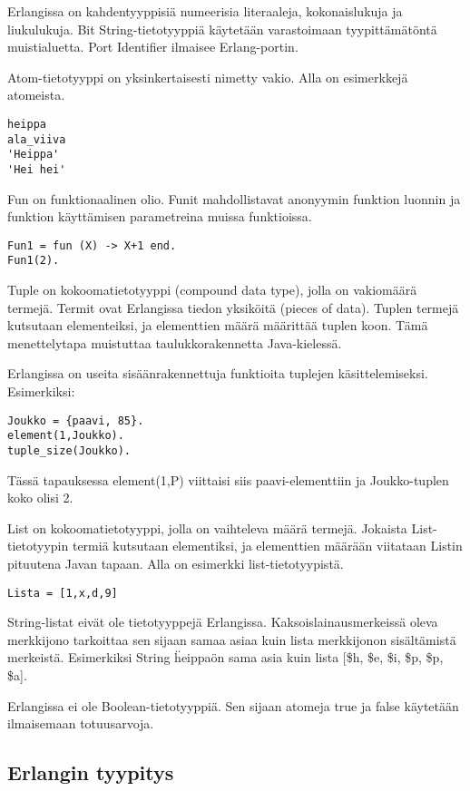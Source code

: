 \documentclass[11pt,oneside,a4paper]{article}
\begin{document}
Erlangissa on kahdentyyppisiä numeerisia literaaleja, kokonaislukuja ja
liukulukuja. Bit String-tietotyyppiä käytetään varastoimaan tyypittämätöntä muistialuetta. Port Identifier ilmaisee Erlang-portin. 

Atom-tietotyyppi on yksinkertaisesti nimetty vakio. Alla on esimerkkejä
atomeista.

\begin{verbatim}
heippa
ala_viiva
'Heippa'
'Hei hei'
\end{verbatim}
Fun on funktionaalinen olio. Funit mahdollistavat anonyymin funktion luonnin ja funktion käyttämisen parametreina muissa funktioissa. 

\begin{verbatim}
Fun1 = fun (X) -> X+1 end.
Fun1(2).
\end{verbatim}
Tuple on kokoomatietotyyppi (compound data type), jolla on vakiomäärä termejä.
Termit ovat Erlangissa tiedon yksiköitä (pieces of data). Tuplen termejä
kutsutaan elementeiksi, ja elementtien määrä määrittää tuplen koon. Tämä
menettelytapa
muistuttaa taulukkorakennetta Java-kielessä.

Erlangissa on useita sisäänrakennettuja funktioita tuplejen käsittelemiseksi.
Esimerkiksi:

\begin{verbatim}
Joukko = {paavi, 85}.
element(1,Joukko).
tuple_size(Joukko).
\end{verbatim}
Tässä tapauksessa element(1,P) viittaisi siis paavi-elementtiin ja Joukko-tuplen
koko olisi 2.

List on kokoomatietotyyppi, jolla on vaihteleva määrä termejä. Jokaista
List-tietotyypin termiä kutsutaan elementiksi, ja elementtien määrään viitataan
Listin pituutena Javan tapaan. Alla on esimerkki list-tietotyypistä.

\begin{verbatim}
Lista = [1,x,d,9] 
\end{verbatim}
String-listat eivät ole tietotyyppejä Erlangissa. Kaksoislainausmerkeissä oleva
merkkijono tarkoittaa sen sijaan samaa asiaa kuin lista merkkijonon sisältämistä
merkeistä. Esimerkiksi String \"heippa\" on sama asia kuin lista [\$h, \$e, \$i,
\$p, \$p, \$a]. 

Erlangissa ei ole Boolean-tietotyyppiä. Sen sijaan atomeja true ja false
käytetään ilmaisemaan totuusarvoja. 

\subsection{Erlangin tyypitys}
\end{document}
